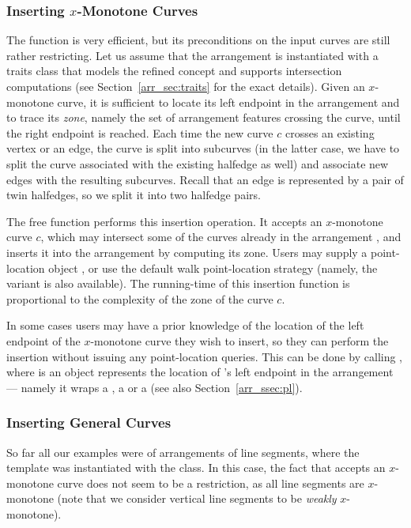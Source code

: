 \subsubsection{Inserting $x$-Monotone Curves}
\label{arr_sssec:insert_x_mon}
%
The  function is very
efficient, but its preconditions on the input curves are still
rather restricting. Let us assume that the arrangement is
instantiated with a traits class that models the refined
 concept and supports
intersection computations (see Section~\ref{arr_sec:traits} for
the exact details). Given an $x$-monotone curve, it is sufficient
to locate its left endpoint in the arrangement and to trace its
{\em zone}, namely the set of arrangement features crossing the curve,
until the right endpoint is reached. Each time the new curve $c$
crosses an existing vertex or an edge, the curve is split into
subcurves (in the latter case, we have to split the curve 
associated with the existing halfedge as well) and associate new
edges with the resulting subcurves. Recall that an edge is represented
by a pair of twin halfedges, so we split it into two halfedge pairs.

The free function  performs
this insertion operation. It accepts an $x$-monotone curve $c$,
which may intersect some of the curves already in the arrangement
, and inserts it into the arrangement by computing its zone.
Users may supply a point-location object , or use the default
walk point-location strategy (namely, the variant
 is also available). The
running-time of this insertion function is proportional to the
complexity of the zone of the curve $c$.

\begin{ccAdvanced}
In some cases users may have a prior knowledge of the location of the
left endpoint of the $x$-monotone curve  they wish to insert,
so they can perform the insertion without issuing any point-location
queries. This can be done by calling
, where  is an
object represents the location of 's left endpoint in the
arrangement --- namely it wraps a , a
 or a  (see
also Section~\ref{arr_ssec:pl}).
\end{ccAdvanced}

\subsubsection{Inserting General Curves}
\label{arr_sssec:insert_gen}
%
So far all our examples were of arrangements of line segments,
where the  template was instantiated with the
 class. In this case, the fact that
 accepts an $x$-monotone curve does not
seem to be a restriction, as all line segments are $x$-monotone
(note that we consider vertical line segments to be {\em weakly}
$x$-monotone).

